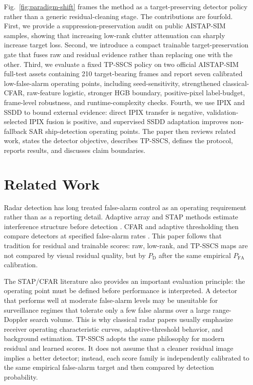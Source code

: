 \documentclass[journal]{IEEEtran}
\begin{document}
Fig.~\ref{fig:paradigm-shift} frames the method as a target-preserving detector policy rather than a generic residual-cleaning stage. The contributions are fourfold. First, we provide a suppression-preservation audit on public AISTAP-SIM samples, showing that increasing low-rank clutter attenuation can sharply increase target loss. Second, we introduce a compact trainable target-preservation gate that fuses raw and residual evidence rather than replacing one with the other. Third, we evaluate a fixed TP-SSCS policy on two official AISTAP-SIM full-test assets containing 210 target-bearing frames and report seven calibrated low-false-alarm operating points, including seed-sensitivity, strengthened classical-CFAR, raw-feature logistic, stronger HGB boundary, positive-pixel label-budget, frame-level robustness, and runtime-complexity checks. Fourth, we use IPIX and SSDD to bound external evidence: direct IPIX transfer is negative, validation-selected IPIX fusion is positive, and supervised SSDD adaptation improves non-fallback SAR ship-detection operating points. The paper then reviews related work, states the detector objective, describes TP-SSCS, defines the protocol, reports results, and discusses claim boundaries.

\section{Related Work}

Radar detection has long treated false-alarm control as an operating requirement rather than as a reporting detail. Adaptive array and STAP methods estimate interference structure before detection \cite{reed1974adaptive,melvin2004stap,melvin2014stap}. CFAR and adaptive thresholding then compare detectors at specified false-alarm rates \cite{rohling1983cfar,kelly1986adaptive,gandhi1988cfar}. This paper follows that tradition for residual and trainable scores: raw, low-rank, and TP-SSCS maps are not compared by visual residual quality, but by $P_{\mathrm{D}}$ after the same empirical $P_{\mathrm{FA}}$ calibration.

The STAP/CFAR literature also provides an important evaluation principle: the operating point must be defined before performance is interpreted. A detector that performs well at moderate false-alarm levels may be unsuitable for surveillance regimes that tolerate only a few false alarms over a large range-Doppler search volume. This is why classical radar papers usually emphasize receiver operating characteristic curves, adaptive-threshold behavior, and background estimation. TP-SSCS adopts the same philosophy for modern residual and learned scores. It does not assume that a cleaner residual image implies a better detector; instead, each score family is independently calibrated to the same empirical false-alarm target and then compared by detection probability.
\end{document}
